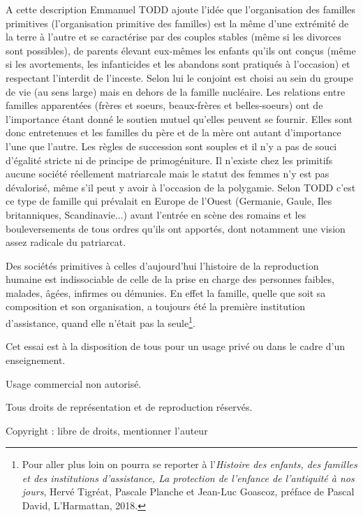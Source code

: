  A cette description Emmanuel TODD ajoute l'idée que l'organisation des familles primitives (l'organisation primitive des familles) est la même d'une extrémité de la terre à l'autre et se caractérise par des couples stables (même si les divorces sont possibles), de parents élevant eux-mêmes les enfants qu'ils ont conçus (même si les avortements, les infanticides et les abandons sont pratiqués à l'occasion) et respectant l'interdit de l'inceste. Selon lui le conjoint est choisi au sein du groupe de vie (au sens large) mais en dehors de la famille nucléaire. Les relations entre familles apparentées (frères et soeurs, beaux-frères et belles-soeurs) ont de l'importance étant donné le soutien mutuel qu'elles peuvent se fournir. Elles sont donc entretenues et les familles du père et de la mère ont autant d'importance l'une que l'autre. Les règles de succession sont souples et il n'y a pas de souci d'égalité stricte ni de principe de primogéniture. Il n'existe chez les primitifs aucune société réellement matriarcale mais le statut des femmes n'y est pas dévalorisé, même s'il peut y avoir à l'occasion de la polygamie. Selon TODD c'est ce type de famille qui prévalait en Europe de l'Ouest (Germanie, Gaule, Iles britanniques, Scandinavie...) avant l'entrée en scène des romains et les bouleversements de tous ordres qu'ils ont apportés, dont notamment une vision assez radicale du patriarcat. 


Des sociétés primitives à celles d'aujourd’hui l'histoire de la reproduction humaine est indissociable de celle de la prise en charge des personnes faibles, malades, âgées, infirmes ou démunies. En effet la famille, quelle que soit sa composition et son organisation, a toujours été la première institution d'assistance, quand elle n'était pas la seule\footnote{Pour aller plus loin on pourra se reporter à l'\emph{Histoire des enfants, des familles et des institutions d'assistance, La protection de l'enfance de l'antiquité à nos jours}, Hervé Tigréat, Pascale Planche et Jean-Luc Goascoz, préface de Pascal David, L'Harmattan, 2018.}.





Cet essai est à la disposition de tous pour un usage privé ou dans le cadre d'un enseignement. 

Usage commercial non autorisé. 

Tous droits de représentation et de reproduction réservés.

Copyright : libre de droits, mentionner l'auteur







